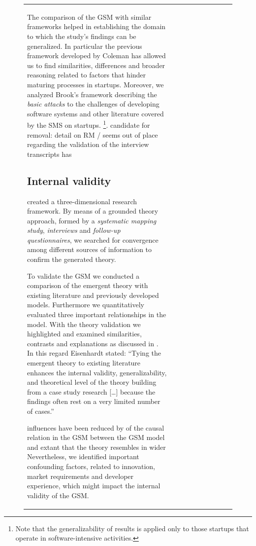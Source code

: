 \documentclass[12pt,journal,compsoc]{../sty/IEEEtran}
\begin{document}
\begin{table}[!t]
\begin{figure}[!t]
\begin{compactitem}
\begin{table}[!t]
\begin{tabular}{|l||c||c||c||c||c||c||c||c||c|}
The comparison of the GSM with similar frameworks helped in establishing the
domain to which the study's findings can be generalized. In particular the
previous framework developed by Coleman \cite{Coleman2008} has allowed  us to
find similarities, differences and broader reasoning related to  factors that
hinder maturing processes in startups. Moreover, we analyzed  Brook's framework
describing the \textit{basic attacks} to the challenges of  developing software
systems and other literature covered by the SMS on startups.
\cite{SMS}\footnote{Note that the generalizability of results is applied only to
those startups that operate in software-intensive activities.}.  %
candidate for removal: detail on RM / seems out of place %
regarding the validation of  %
the interview transcripts has  %

\subsection{Internal validity} %
created a three-dimensional research  framework. By means of a grounded theory
approach, formed by a  \textit{systematic mapping study}, \textit{interviews}
and \textit{follow-up  questionnaires}, we searched for convergence among
different sources of  information to confirm the generated theory.

To validate the GSM we conducted a comparison of the emergent theory with
existing literature and previously developed models. Furthermore we
quantitatively evaluated three important relationships in the model. With the
theory validation we highlighted and examined similarities, contrasts and
explanations as discussed in \cite{Eisenhardt2007}. In this regard Eisenhardt
stated: ``Tying the emergent theory to existing literature enhances the internal
validity, generalizability, and theoretical level of the theory building from  a
case study research [\ldots] because the findings often rest on a very limited
number of cases.''

influences have been reduced by  %
of the causal relation in the GSM  %
between the GSM model and extant  %
that the theory resembles in wider  %
Nevertheless, we identified important confounding factors, related to
innovation, market requirements and developer experience, which might  impact
the internal validity of the GSM.


\end{tabular}
\end{table}
\end{compactitem}
\end{figure}
\end{table}
\end{document}
